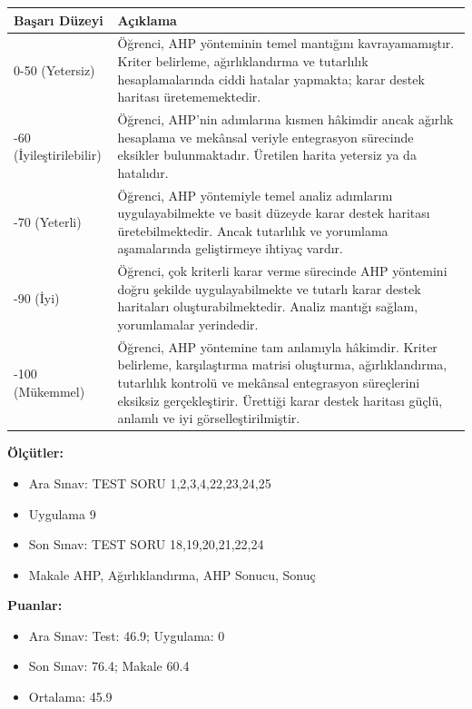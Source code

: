 \documentclass[12pt,a4paper]{article}
\begin{document}
\vspace{0.5cm}
\begin{longtable}{p{3cm}p{12cm}}
\toprule
\textbf{Başarı Düzeyi} & \textbf{Açıklama} \\
\midrule
0-50 (Yetersiz) & Öğrenci, AHP yönteminin temel mantığını kavrayamamıştır. Kriter belirleme, ağırlıklandırma ve tutarlılık hesaplamalarında ciddi hatalar yapmakta; karar destek haritası üretememektedir. \\
\addlinespace
50-60 (İyileştirilebilir) & Öğrenci, AHP'nin adımlarına kısmen hâkimdir ancak ağırlık hesaplama ve mekânsal veriyle entegrasyon sürecinde eksikler bulunmaktadır. Üretilen harita yetersiz ya da hatalıdır. \\
\addlinespace
60-70 (Yeterli) & Öğrenci, AHP yöntemiyle temel analiz adımlarını uygulayabilmekte ve basit düzeyde karar destek haritası üretebilmektedir. Ancak tutarlılık ve yorumlama aşamalarında geliştirmeye ihtiyaç vardır. \\
\addlinespace
70-90 (İyi) & Öğrenci, çok kriterli karar verme sürecinde AHP yöntemini doğru şekilde uygulayabilmekte ve tutarlı karar destek haritaları oluşturabilmektedir. Analiz mantığı sağlam, yorumlamalar yerindedir. \\
\addlinespace
90-100 (Mükemmel) & Öğrenci, AHP yöntemine tam anlamıyla hâkimdir. Kriter belirleme, karşılaştırma matrisi oluşturma, ağırlıklandırma, tutarlılık kontrolü ve mekânsal entegrasyon süreçlerini eksiksiz gerçekleştirir. Ürettiği karar destek haritası güçlü, anlamlı ve iyi görselleştirilmiştir. \\
\bottomrule
\end{longtable}

\vspace{0.5cm}
\textbf{Ölçütler:} 
\begin{itemize}
    \item Ara Sınav: TEST SORU 1,2,3,4,22,23,24,25
    \item Uygulama 9
    \item Son Sınav: TEST SORU 18,19,20,21,22,24
    \item Makale AHP, Ağırlıklandırma, AHP Sonucu, Sonuç
\end{itemize}

\textbf{Puanlar:} 
\begin{itemize}
    \item Ara Sınav: Test: 46.9; Uygulama: 0
    \item Son Sınav: 76.4; Makale 60.4
    \item Ortalama: 45.9
\end{itemize}
\end{document}
